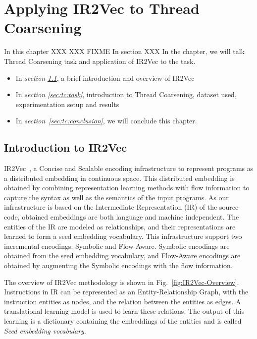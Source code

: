\chapter{Applying IR2Vec to Thread Coarsening}
\label{chap:ch2}

In this chapter XXX XXX FIXME In section XXX
In the chapter, we will talk Thread Coarsening task and application of IR2Vec to the task.
\begin{itemize}
    
    \item In \textit{section \ref{sec:tc:introir2vec}}, a brief introduction and overview of IR2Vec 
    
    \item In \textit{section \ref{sec:tc:task}}, introduction to Thread Coarsening, dataset used,  experimentation setup and results  
    
    \item  In \textit{section~\ref{sec:tc:conclusion}}, we will conclude this chapter.

\end{itemize}


\section{Introduction to IR2Vec}\label{sec:tc:introir2vec}
IR2Vec~\cite{IR2Vec}, a Concise and Scalable encoding infrastructure to represent programs as a distributed embedding in continuous space. This distributed embedding is obtained by combining representation learning methods with flow information to capture the syntax as well as the semantics of the input programs. As our infrastructure is based on the Intermediate Representation (IR) of the source code, obtained embeddings are both language and machine independent. The entities of the IR are modeled as relationships, and their
representations are learned to form a seed embedding vocabulary. This infrastructure support two incremental encodings: Symbolic and Flow-Aware. Symbolic encodings are obtained from the seed embedding vocabulary, and Flow-Aware encodings are obtained by augmenting the Symbolic encodings with the flow information.

The overview of IR2Vec methodology is shown in Fig.~\ref{fig:IR2Vec-Overview}. Instructions in IR can be represented as an Entity-Relationship Graph, with the instruction entities as nodes, and the relation between the entities as edges. A translational learning model is used to learn these relations. The output of this learning is a dictionary containing the embeddings of the entities and is called \textit{Seed embedding vocabulary}. 

